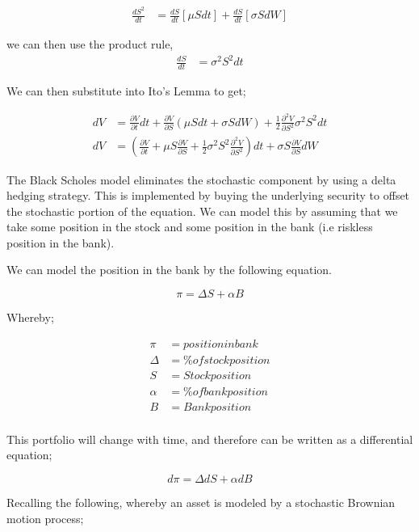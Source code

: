 \documentclass[12pt]{article}
\begin{document}
\begin{align*}
\frac{dS^2}{dt} &= \frac{dS}{dt}[\mu Sdt] + \frac{dS}{dt}[\sigma SdW]
\end{align*}

we can then use the product rule,
\begin{align*}
\frac{dS}{dt} &= \sigma ^2 S^2 dt 
\end{align*}

We can then substitute into Ito's Lemma to get;

\begin{align*}
dV &= \frac{\partial V}{\partial t}dt+\frac{\partial V}{\partial S}(\mu Sdt + \sigma SdW) + \frac{1}{2}\frac{\partial ^2V}{\partial S^2}\sigma^2 S^2 dt \\
dV &= (\frac{\partial V}{\partial t} + \mu S \frac{\partial V}{\partial S} + \frac{1}{2}\sigma ^2 S^2 \frac{\partial ^2V}{\partial S^2})dt + \sigma S \frac {\partial V}{\partial S}dW
\end{align*}

The Black Scholes model eliminates the stochastic component by using a delta hedging strategy. This is implemented by buying the underlying security to offset the stochastic portion of the equation.
We can model this by assuming that we take some position in the stock and some position in the bank (i.e riskless position in the bank).

We can model the position in the bank by the following equation.

\begin{equation}
\pi = \Delta S + \alpha B
\end{equation}

Whereby;

\begin{align*}
\pi &= position in bank \\
\Delta &= \% of stock position \\
S &= Stock position \\
\alpha &= \% of bank position \\
B &= Bank position \\
\end{align*}

This portfolio will change with time, and therefore can be written as a differential equation;

\begin{equation}
d\pi = \Delta dS + \alpha dB
\end{equation}

Recalling the following, whereby an asset is modeled by a stochastic Brownian motion process;
\end{document}
